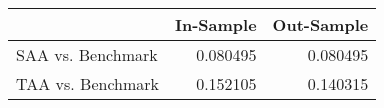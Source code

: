 \begin{tabular}{lrr}
\toprule
{} &  In-Sample &  Out-Sample \\
\midrule
SAA vs. Benchmark &   0.080495 &    0.080495 \\
TAA vs. Benchmark &   0.152105 &    0.140315 \\
\bottomrule
\end{tabular}
